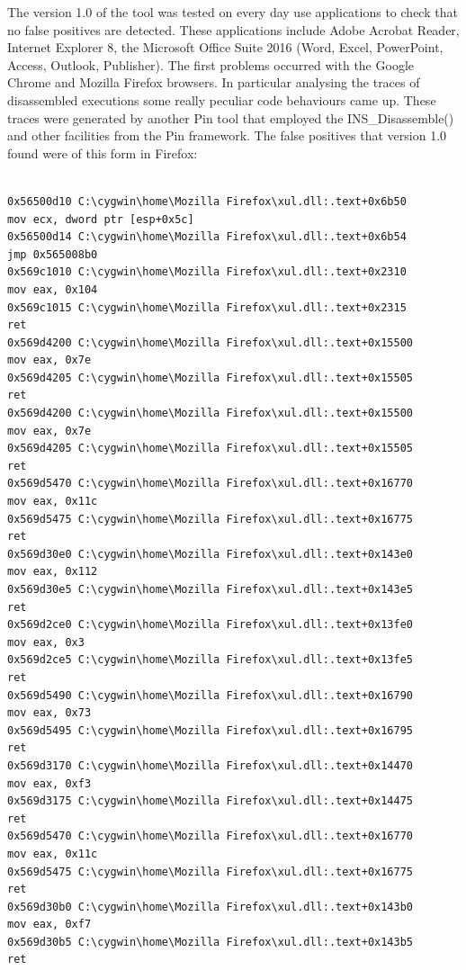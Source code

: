 \documentclass[Lau,binding=0.6cm]{sapthesis}
\begin{document}
The version 1.0 of the tool was tested on every day use applications to check that no false positives are detected. These applications include Adobe Acrobat Reader, Internet Explorer 8, the Microsoft Office Suite 2016 (Word, Excel, PowerPoint, Access, Outlook, Publisher). The first problems occurred with the Google Chrome and Mozilla Firefox browsers. In particular analysing the traces of disassembled executions some really peculiar code behaviours came up. These traces were generated by another Pin tool that employed the INS\_Disassemble() and other facilities from the Pin framework. The false positives that version 1.0 found were of this form in Firefox:
\begingroup
    \fontsize{8pt}{9pt}\selectfont
\begin{verbatim}

0x56500d10 C:\cygwin\home\Mozilla Firefox\xul.dll:.text+0x6b50			mov ecx, dword ptr [esp+0x5c]
0x56500d14 C:\cygwin\home\Mozilla Firefox\xul.dll:.text+0x6b54         jmp 0x565008b0
0x569c1010 C:\cygwin\home\Mozilla Firefox\xul.dll:.text+0x2310         mov eax, 0x104
0x569c1015 C:\cygwin\home\Mozilla Firefox\xul.dll:.text+0x2315         ret 
0x569d4200 C:\cygwin\home\Mozilla Firefox\xul.dll:.text+0x15500        mov eax, 0x7e
0x569d4205 C:\cygwin\home\Mozilla Firefox\xul.dll:.text+0x15505        ret 
0x569d4200 C:\cygwin\home\Mozilla Firefox\xul.dll:.text+0x15500        mov eax, 0x7e
0x569d4205 C:\cygwin\home\Mozilla Firefox\xul.dll:.text+0x15505        ret 
0x569d5470 C:\cygwin\home\Mozilla Firefox\xul.dll:.text+0x16770        mov eax, 0x11c
0x569d5475 C:\cygwin\home\Mozilla Firefox\xul.dll:.text+0x16775        ret 
0x569d30e0 C:\cygwin\home\Mozilla Firefox\xul.dll:.text+0x143e0        mov eax, 0x112
0x569d30e5 C:\cygwin\home\Mozilla Firefox\xul.dll:.text+0x143e5        ret 
0x569d2ce0 C:\cygwin\home\Mozilla Firefox\xul.dll:.text+0x13fe0        mov eax, 0x3
0x569d2ce5 C:\cygwin\home\Mozilla Firefox\xul.dll:.text+0x13fe5        ret 
0x569d5490 C:\cygwin\home\Mozilla Firefox\xul.dll:.text+0x16790        mov eax, 0x73
0x569d5495 C:\cygwin\home\Mozilla Firefox\xul.dll:.text+0x16795        ret 
0x569d3170 C:\cygwin\home\Mozilla Firefox\xul.dll:.text+0x14470        mov eax, 0xf3
0x569d3175 C:\cygwin\home\Mozilla Firefox\xul.dll:.text+0x14475        ret 
0x569d5470 C:\cygwin\home\Mozilla Firefox\xul.dll:.text+0x16770        mov eax, 0x11c
0x569d5475 C:\cygwin\home\Mozilla Firefox\xul.dll:.text+0x16775        ret 
0x569d30b0 C:\cygwin\home\Mozilla Firefox\xul.dll:.text+0x143b0        mov eax, 0xf7
0x569d30b5 C:\cygwin\home\Mozilla Firefox\xul.dll:.text+0x143b5        ret 

\end{verbatim}
\end{document}
